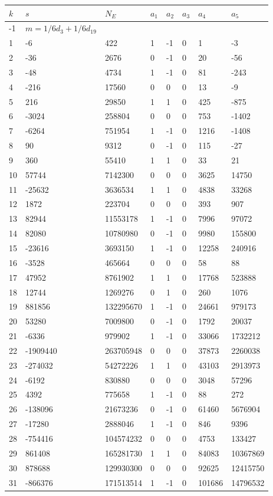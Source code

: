 \documentclass{amsart}
\begin{document}
\begin{longtable}{|l|l|l|lllll|}
\hline
$k$ & $s$ & $N_E$ & $a_1$ & $a_2$ & $a_3$ & $a_4$ & $a_5$\\
\hline
-1&$m=1/6d_{3}+1/6d_{19}$&&\multicolumn{5}{c|}{}\\
1&-6&422&1&-1&0&1&-3\\
2&-36&2676&0&-1&0&20&-56\\
3&-48&4734&1&-1&0&81&-243\\
4&-216&17560&0&0&0&13&-9\\
5&216&29850&1&1&0&425&-875\\
6&-3024&258804&0&0&0&753&-1402\\
7&-6264&751954&1&-1&0&1216&-1408\\
8&90&9312&0&-1&0&115&-27\\
9&360&55410&1&1&0&33&21\\
10&57744&7142300&0&0&0&3625&14750\\
11&-25632&3636534&1&1&0&4838&33268\\
12&1872&223704&0&0&0&393&907\\
13&82944&11553178&1&-1&0&7996&97072\\
14&82080&10780980&0&-1&0&9980&155800\\
15&-23616&3693150&1&-1&0&12258&240916\\
16&-3528&465664&0&0&0&58&88\\
17&47952&8761902&1&1&0&17768&523888\\
18&12744&1269276&0&1&0&260&1076\\
19&881856&132295670&1&-1&0&24661&979173\\
20&53280&7009800&0&-1&0&1792&20037\\
21&-6336&979902&1&-1&0&33066&1732212\\
22&-1909440&263705948&0&0&0&37873&2260038\\
23&-274032&54272226&1&1&0&43103&2913973\\
24&-6192&830880&0&0&0&3048&57296\\
25&4392&775658&1&-1&0&88&272\\
26&-138096&21673236&0&-1&0&61460&5676904\\
27&-17280&2888046&1&-1&0&846&9396\\
28&-754416&104574232&0&0&0&4753&133427\\
29&861408&165281730&1&1&0&84083&10367869\\
30&878688&129930300&0&0&0&92625&12415750\\
31&-866376&171513514&1&-1&0&101686&14796532\\

\end{longtable}
\end{document}

